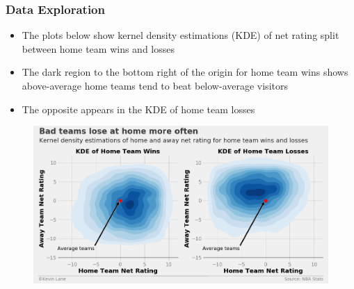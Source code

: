 \documentclass{beamer}
\begin{document}
\begin{frame}
\frametitle{Data Exploration}
\begin{itemize}
    \item The plots below show kernel density estimations (KDE) of net rating split between home team wins and losses
    \item The dark region to the bottom right of the origin for home team wins shows above-average home teams tend to beat below-average visitors
    \item The opposite appears in the KDE of home team losses
\end{itemize}
\begin{figure}
\includegraphics[scale=0.35]{../docs/assets/images/data-exploration/net-rating-win-loss-kde.png}
\end{figure}
\end{frame}
\end{document}
